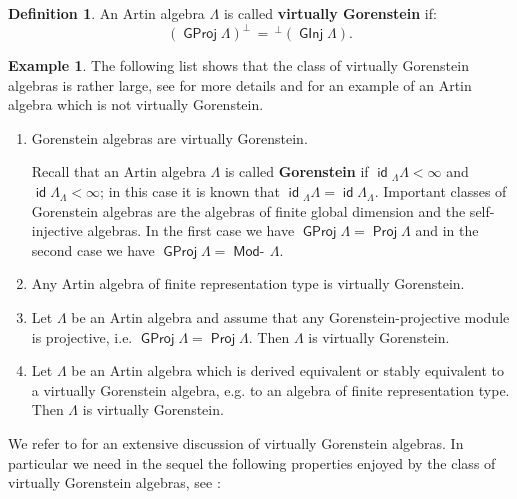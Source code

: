 \documentclass[oneside, a4paper,reqno]{amsart}
\numberwithin{equation}{section}
\theoremstyle{definition}
\newtheorem{defn}[thm]{Definition}
\newtheorem{exam}[thm]{Example}
\begin{document}
\begin{defn} An Artin algebra ${\Lambda}$ is called {\bf virtually Gorenstein}
if:
\[({\operatorname{\mathsf{GProj}}\nolimits}{\Lambda})^\perp \, = \, {^\perp({\operatorname{\mathsf{GInj}}\nolimits}{\Lambda})}.\]
\end{defn}

\begin{exam} The following list shows that the class of virtually
Gorenstein algebras is rather large, see \cite{B:cm} for more
details and \cite{BK} for an example of an Artin algebra which is
not virtually Gorenstein.
\begin{enumerate}
\item[{\bf 1.}] Gorenstein algebras are virtually Gorenstein.

Recall that an Artin algebra $\Lambda$ is called {\bf Gorenstein} if
$\operatorname*{\mathsf{id}}{_{\Lambda}}\Lambda < \infty$ and $\operatorname*{\mathsf{id}}\Lambda_{\Lambda} <
\infty$; in this case it is known that $\operatorname*{\mathsf{id}}{_{\Lambda}}\Lambda =
\operatorname*{\mathsf{id}}\Lambda_{\Lambda}$. Important classes of Gorenstein algebras are
the algebras of finite global dimension and the self-injective
algebras. In the first case we have ${\operatorname{\mathsf{GProj}}\nolimits}\Lambda = \operatorname*{\mathsf{Proj}}\Lambda$
and in the second case we have ${\operatorname{\mathsf{GProj}}\nolimits}\Lambda = \operatorname*{\mathsf{Mod}-\!}\Lambda$.
\item[{\bf 2.}] Any Artin algebra of finite representation type is virtually
Gorenstein.
\item[{\bf 3.}] Let $\Lambda$ be an Artin algebra and assume that any
  Gorenstein-projective module is projective,
i.e. ${\operatorname{\mathsf{GProj}}\nolimits}\Lambda = \operatorname*{\mathsf{Proj}}\Lambda$.  Then $\Lambda$ is virtually
Gorenstein.
\item[{\bf 4.}] Let $\Lambda$ be an Artin algebra which is derived equivalent
or stably equivalent to a virtually Gorenstein algebra, e.g. to an
algebra of finite representation type. Then $\Lambda$ is virtually
Gorenstein.
\end{enumerate}
\end{exam}

We refer to \cite{B:cm} for an extensive discussion of virtually
Gorenstein algebras. In particular we need in the sequel the
following properties enjoyed by the class of virtually Gorenstein
algebras, see \cite{B:cm, BK}:
\end{document}
